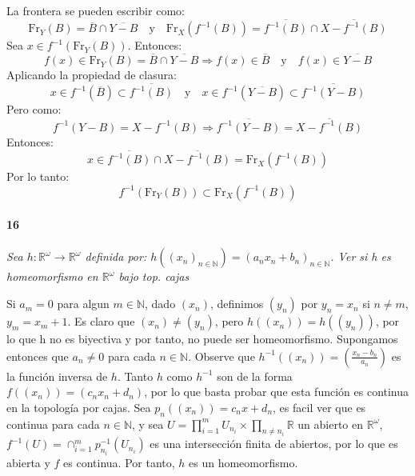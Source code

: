 \documentclass[12pt]{article}
\begin{document}
La frontera se pueden escribir como:
\[
\mathrm{Fr}_Y(B) = \overline{B} \cap \overline{Y - B}
\quad \text{y} \quad
\mathrm{Fr}_X(f^{-1}(B)) = \overline{f^{-1}(B)} \cap \overline{X - f^{-1}(B)}
\]
Sea \( x \in f^{-1}(\mathrm{Fr}_Y(B)) \).  
Entonces:
\[
f(x) \in \mathrm{Fr}_Y(B) = \overline{B} \cap \overline{Y - B}
\Rightarrow
f(x) \in \overline{B} \quad \text{y} \quad f(x) \in \overline{Y - B}
\]
Aplicando la propiedad de clasura:
\[
x \in f^{-1}(\overline{B}) \subset \overline{f^{-1}(B)}
\quad \text{y} \quad
x \in f^{-1}(\overline{Y - B}) \subset \overline{f^{-1}(Y - B)}
\]
Pero como:
\[
f^{-1}(Y - B) = X - f^{-1}(B)
\Rightarrow
\overline{f^{-1}(Y - B)} = \overline{X - f^{-1}(B)}
\]
Entonces:
\[
x \in \overline{f^{-1}(B)} \cap \overline{X - f^{-1}(B)} = \mathrm{Fr}_X(f^{-1}(B))
\]
Por lo tanto:
\[
f^{-1}(\mathrm{Fr}_Y(B)) \subset \mathrm{Fr}_X(f^{-1}(B))
\]

\paragraph{16}
\textit{Sea $h:\mathbb{R}^\omega\rightarrow\mathbb{R}^\omega$ definida por: $h((x_n)_{n\in\mathbb{N}})=(a_n x_n +b_n)_{n\in\mathbb{N}}$. Ver si h es homeomorfismo en $\mathbb{R}^\omega$ bajo top. cajas}

Si $a_m=0$ para algun $m \in \mathbb{N}$, dado $(x_n)$, definimos $(y_n)$ por $y_n=x_n$ si $n \neq m$, $y_m=x_m+1$. Es claro que $(x_n) \neq (y_n)$, pero $h((x_n))=h((y_n))$, por lo que h no es biyectiva y por tanto, no puede ser homeomorfismo.
Supongamos entonces que $a_n \neq 0$ para cada $n \in \mathbb{N}$. Observe que $h^{-1}((x_n))=(\frac{x_n-b_n}{a_n})$ es la función inversa de $h$. Tanto $h$ como $h^{-1}$ son de la forma $f((x_n))=(c_n x_n+d_n)$, por lo que basta probar que esta función
es continua en la topología por cajas. Sea $p_n((x_n))=c_nx+d_n$, es facil ver que es continua para cada $n \in \mathbb{N}$, y sea $U=\prod_{i=1}^{m} U_{n_i} \times \prod_{n\neq n_i} \mathbb{R}$ un abierto en $\mathbb{R}^\omega$,  $f^{-1}(U)=\cap_{i=1}^{m} p^{-1}_{n_i}(U_{n_i})$ es una
intersección finita de abiertos, por lo que es abierta y $f$ es continua. Por tanto, $h$ es un homeomorfismo.
\end{document}
